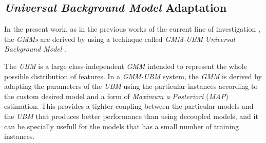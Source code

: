 \subsection{\textit{Universal Background Model} Adaptation}

In the present work, as in the previous works of the current line of investigation
\cite{detection_phone_level_mispronunciation_learning, main}, the \textit{GMMs} are derived
by using a techinque called \textit{GMM-UBM} \textit{Universal Background Model} \cite{ubm_adaptation}.

The \textit{UBM} is a large class-independent \textit{GMM} intended to represent the whole possible
distribution of features. In a \textit{GMM-UBM} system, the
\textit{GMM} is derived by adapting the parameters of the \textit{UBM} using the particular
instances according to the custom desired model and a form of
\textit{Maximum a Posteriori} (\textit{MAP}) estimation. This provides a tighter coupling
between the particular models and the \textit{UBM} that produces better performance than
using decoupled models, and it can be specially usefull for the models that has a small number
of training instances.
